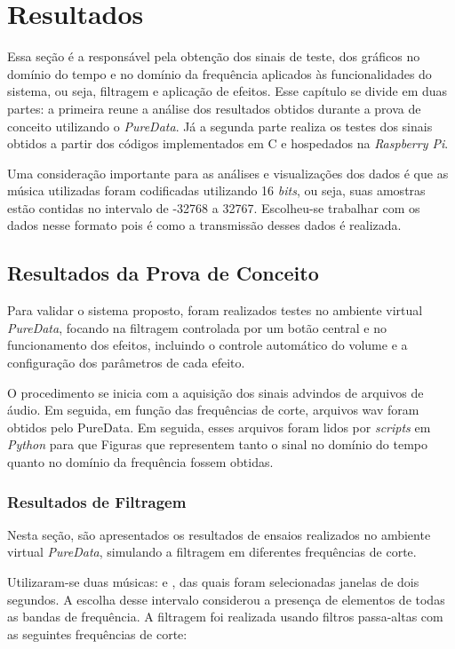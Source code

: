 \chapter[Resultados]{Resultados}
\label{sec:Resultados}

Essa seção é a responsável pela obtenção dos sinais de teste, dos gráficos no domínio do tempo e no domínio da frequência aplicados às funcionalidades do sistema, ou seja, filtragem e aplicação de efeitos. Esse capítulo se divide em duas partes: a primeira reune a análise dos resultados obtidos durante a prova de conceito utilizando o \textit{PureData}. Já a segunda parte realiza os testes dos sinais obtidos a partir dos códigos implementados em C e hospedados na \textit{Raspberry Pi}.

Uma consideração importante para as análises e visualizações dos dados é que as música utilizadas foram codificadas utilizando 16 \textit{bits}, ou seja, suas amostras estão contidas no intervalo de -32768 a 32767. Escolheu-se trabalhar com os dados nesse formato pois é como a transmissão desses dados é realizada.

\section{Resultados da Prova de Conceito}

Para validar o sistema proposto, foram realizados testes no ambiente virtual \textit{PureData}, focando na filtragem controlada por um botão central e no funcionamento dos efeitos, incluindo o controle automático do volume e a configuração dos parâmetros de cada efeito.

O procedimento se inicia com a aquisição dos sinais advindos de arquivos de áudio. Em seguida, em função das frequências de corte, arquivos wav foram obtidos pelo PureData. Em seguida, esses arquivos foram lidos por \textit{scripts} em \textit{Python} para que Figuras que representem tanto o sinal no domínio do tempo quanto no domínio da frequência fossem obtidas. 

\subsection{Resultados de Filtragem}

Nesta seção, são apresentados os resultados de ensaios realizados no ambiente virtual \textit{PureData}, simulando a filtragem em diferentes frequências de corte.

Utilizaram-se duas músicas: \cite{track01} e \cite{track02}, das quais foram selecionadas janelas de dois segundos. A escolha desse intervalo considerou a presença de elementos de todas as bandas de frequência. A filtragem foi realizada usando filtros passa-altas com as seguintes frequências de corte:

